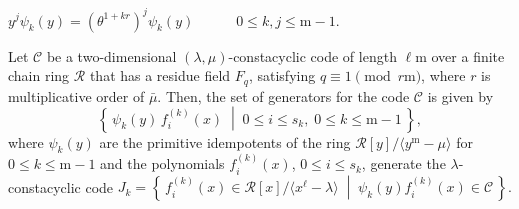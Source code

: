 \documentclass[10pt,a4paper]{amsart}
\begin{document}
\begin{lemma}\label{lem:units}
    $y^j\psi_k(y)=(\theta^{1+kr})^j\psi_k(y)$ ~~  ~~ $0\leq k,j\leq \mathrm{m}-1$.
\end{lemma}

\begin{theorem}\label{thm:structure}
Let $\mathscr{C}$ be a two-dimensional $(\lambda,\mu)$-constacyclic code of length $\ell\mathrm{m}$ over a finite chain ring $\mathcal{R}$ that has a residue field $F_q$, satisfying $q \equiv 1 \pmod{r\mathrm{m}}$, where $r$ is multiplicative order of $\bar{\mu}$. Then, the set of generators for the code $\mathscr{C}$ is given by 
\[
\left\{\, \psi_k(y)\, f_i^{(k)}(x) \;\middle|\; 0 \le i \le s_{k},\; 0 \le k \le \mathrm{m}-1 \,\right\},
\]
where $\psi_k(y)$ are the primitive idempotents of the ring $\mathcal{R}[y]/\langle y^{\mathrm{m}}-\mu \rangle$ for $0 \le k \le \mathrm{m}-1$ and the polynomials $f_i^{(k)}(x)$, $0 \le i \le s_{k}$, generate the $\lambda$-constacyclic code $J_k = \left\{\, f_i^{(k)}(x) \in \mathcal{R}[x]/\langle x^{\ell}-\lambda \rangle \;\middle|\; \psi_k(y) f_i^{(k)}(x) \in \mathscr{C} \,\right\}.$
\end{theorem}
\end{document}
